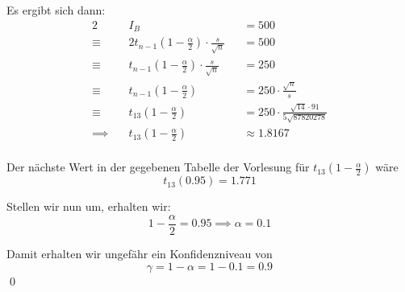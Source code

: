 \documentclass{abgabe}
\begin{document}
\begin{questions}
\begin{parts}
\begin{solution}
            Es ergibt sich dann:
            \begin{alignat*}{2}
                               & I_B                                                                  &  & = 500                                                   \\
                \equiv \quad   & 2 t_{n-1} \left( 1-\frac{\alpha}{2} \right) \cdot \frac{s}{\sqrt{n}} &  & = 500                                                   \\
                \equiv \quad   & t_{n-1} \left( 1-\frac{\alpha}{2} \right) \cdot \frac{s}{\sqrt{n}}   &  & = 250                                                   \\
                \equiv \quad   & t_{n-1} \left( 1-\frac{\alpha}{2} \right)                            &  & = 250 \cdot \frac{\sqrt{n}}{s}                          \\
                \equiv \quad   & t_{13} \left( 1-\frac{\alpha}{2} \right)                             &  & = 250 \cdot \frac{\sqrt{14} \cdot 91}{5\sqrt{87820278}} \\
                \implies \quad & t_{13} \left( 1-\frac{\alpha}{2} \right)                             &  & \approx 1.8167                                          \\
            \end{alignat*}

            Der nächste Wert in der gegebenen Tabelle der Vorlesung für $t_{13} \left( 1-\frac{\alpha}{2} \right)$ wäre
            \[
                t_{13}(0.95) = 1.771
            \]

            Stellen wir nun um, erhalten wir:
            \[
                1 - \frac{\alpha}{2} = 0.95 \implies \alpha = 0.1
            \]

            Damit erhalten wir ungefähr ein Konfidenzniveau von
            \[
                \gamma = 1 -\alpha = 1 - 0.1 = 0.9
            \]
            \qed
        \end{solution}
    \end{parts}
\end{questions}
\end{document}
